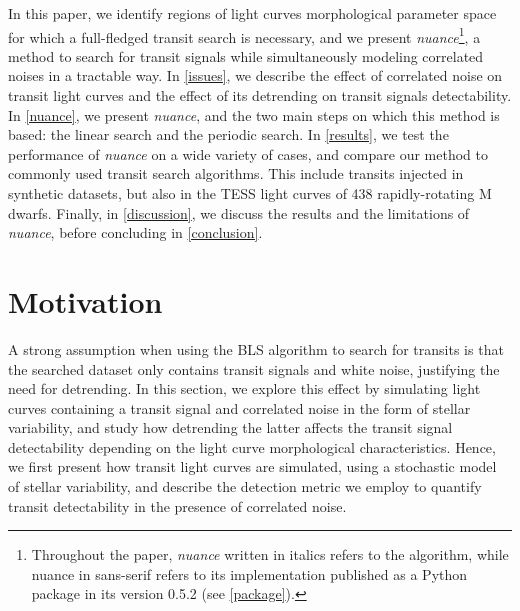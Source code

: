 \documentclass[modern,linenumbers]{aastex631}
\newcommand{\nuancemethod}{\textit{nuance}}
\newcommand{\nuance}{\nuancemethod{}}
\newcommand{\nuancecode}{\textsf{nuance}}
\begin{document}
\newpage
In this paper, we identify regions of light curves morphological parameter space for which a full-fledged transit search is necessary, and we present \nuancemethod{}\footnote{Throughout the paper, \nuancemethod{} written in italics refers to the algorithm, while \nuancecode{} in sans-serif refers to its implementation published as a Python package in its version 0.5.2 (see \autoref{package}).}, a method to search for transit signals while simultaneously modeling correlated noises in a tractable way. In \autoref{issues}, we describe the effect of correlated noise on transit light curves and the effect of its detrending on transit signals detectability. In \autoref{nuance}, we present \nuance{}, and the two main steps on which this method is based: the linear search and the periodic search. In \autoref{results}, we test the performance of \nuance{} on a wide variety of cases, and compare our method to commonly used transit search algorithms. This include transits injected in synthetic datasets, but also in the TESS light curves of 438 rapidly-rotating M dwarfs. Finally, in \autoref{discussion}, we discuss the results and the limitations of \nuance{}, before concluding in \autoref{conclusion}.
\newpage
\section{Motivation}\label{issues}
A strong assumption when using the BLS algorithm to search for transits is that the searched dataset only contains transit signals and white noise, justifying the need for detrending. In this section, we explore this effect by simulating light curves containing a transit signal and correlated noise in the form of stellar variability, and study how detrending the latter affects the transit signal detectability depending on the light curve morphological characteristics. Hence, we first present how transit light curves are simulated, using a stochastic model of stellar variability, and describe the detection metric we employ to quantify transit detectability in the presence of correlated noise.
\end{document}
